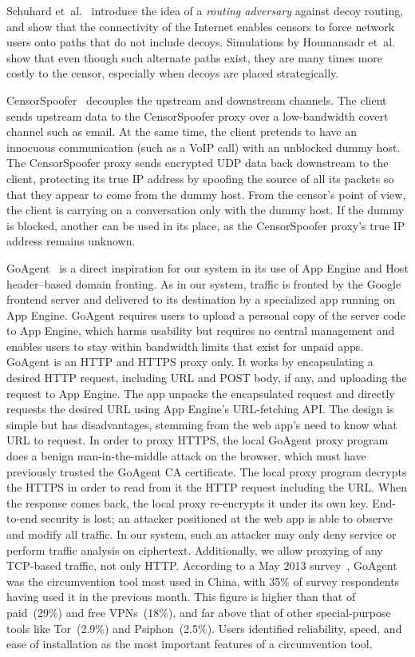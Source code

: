 \documentclass[conference]{IEEEtran}
\begin{document}
Schuhard et~al.~\cite{ccs2012-decoys}
introduce the idea of a \emph{routing adversary} against decoy routing,
and show that the connectivity of the Internet enables
censors to force network users onto paths that do not include decoys.
Simulations by Houmansadr et~al.~\cite{nodirectionhome}
show that even though such alternate paths exist,
they are many times more costly to the censor,
especially when decoys are placed strategically.

CensorSpoofer~\cite{censorspoofer}
decouples the upstream and downstream channels.
The client sends upstream data to the CensorSpoofer proxy over a low-bandwidth covert channel such as email.
At the same time, the client pretends to have an innocuous communication (such as a VoIP call) with an unblocked dummy host.
The CensorSpoofer proxy sends encrypted UDP data back downstream to the client,
protecting its true IP address by spoofing the source of all its packets
so that they appear to come from the dummy host.
From the censor's point of view, the client is carrying on a conversation only with the dummy host.
If the dummy is blocked, another can be used in its place,
as the CensorSpoofer proxy's true IP address remains unknown.


GoAgent~\cite{goagent} is a direct inspiration for our system in its use of App
Engine and Host header--based domain fronting.
As in our system, traffic is fronted by the Google frontend server
and delivered to its destination by a specialized app running on App Engine.
GoAgent requires users to upload a personal copy of the server code to App Engine,
which harms usability but requires no central management
and enables users to stay within bandwidth limits that exist for unpaid apps.
GoAgent is an HTTP and HTTPS proxy only.
It works by encapsulating a desired HTTP request, including URL and POST body, if any,
and uploading the request to App Engine.
The app unpacks the encapsulated request and directly requests the desired URL using
App Engine's URL-fetching API.
The design is simple but has disadvantages, stemming from the web app's
need to know what URL to request.
In order to proxy HTTPS, the local GoAgent proxy program does a benign man-in-the-middle
attack on the browser, which must have previously trusted the GoAgent CA certificate.
The local proxy program decrypts the HTTPS in order to read from it the HTTP request including the URL.
When the response comes back, the local proxy re-encrypts it under its own key.
End-to-end security is lost; an attacker positioned at the web app
is able to observe and modify all traffic.
In our system, such an attacker may only deny service or perform traffic analysis on ciphertext.
Additionally, we allow proxying of any TCP-based traffic, not only HTTP.
According to a May 2013 survey~\cite{collateral-freedom},
GoAgent was the circumvention tool most used in
China, with 35\% of survey respondents having used it in the previous month.
This figure is higher than that of paid~(29\%) and free VPNs~(18\%), and far
above that of other special-purpose tools like Tor~(2.9\%) and Psiphon~(2.5\%).
Users identified reliability, speed, and ease of installation as the most important features of a circumvention tool.
\end{document}
